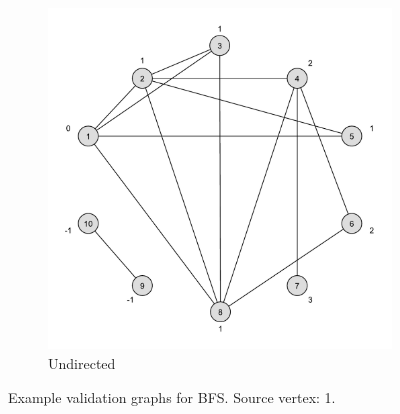 \begin{figure}[h]
\begin{subfigure}{0.496\textwidth}
		\includegraphics[scale=\examplescale]{figures/examples/bfs-undir.pdf}
		\caption{Undirected}
	\end{subfigure}
	\caption{Example validation graphs for BFS. Source vertex: 1.}
	\label{fig:bfs_example}
\end{figure}

